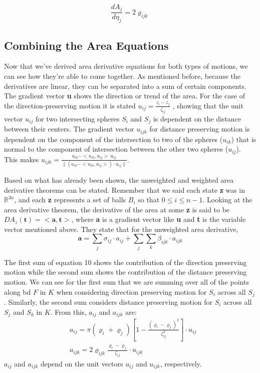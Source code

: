\documentclass{article}
\newcommand{\R}{\mathbb{R}}
\begin{document}
\begin{equation*}
\frac{dA_j}{d\eta_j }= 2\varrho_{ijk}
\end{equation*}

\subsection{Combining the Area Equations}
Now that we've derived area derivative equations for both types of motions, we can see how they’re able to come together. As mentioned before, because the derivatives are linear, they can be separated into a sum of certain components. The gradient vector \textbf{u} shows the direction or trend of the area. For the case of the direction-preserving motion it is stated $u_{ij} = \frac{z_i - z_j}{\zeta_{ij}}$ , showing that the unit vector $u_{ij}$ for two intersecting spheres $S_i$ and $S_j$ is dependent on the distance between their centers. The gradient vector $u_{ijk}$ for distance preserving motion is dependent on the component of the intersection to two of the spheres ($u_{ik}$) that is normal to the component of intersection between the other two spheres ($u_{ij}$). This makes $u_{ijk} = \frac{u_{ik} - <u_{ik},u_{ij}> \cdot u_{ij}}{\|(u_{ik} - <u_{ik},u_{ij}>) \cdot u_{ij}\|}$.

Based on what has already been shown, the unweighted and weighted area derivative theorems can be stated. Remember that we said each state \textbf{z} was in $\R^{3n}$, and each \textbf{z} represents a set of balls $B_i$ so that $0\leq i \leq n-1$. Looking at the area derivative theorem, the derivative of the area at some \textbf{z} is said to be $DA_z(\textbf{t}) = <\textbf{a},\textbf{t}>$, where \textbf{a} is a gradient vector like \textbf{u} and 	\textbf{t} is the variable vector mentioned above. They state that for the unweighted area derivative,
\begin{equation}
\textbf{a} = \sum_j \sigma_{ij}\cdot a_{ij}+ \sum_j \sum_k \beta_{ijk}\cdot a_{ijk}
\end{equation}

The first sum of equation 10 shows the contribution of the direction preserving motion while the second sum shows the contribution of the distance preserving motion. We can see for the first sum that we are summing over all of the points along bd $F$ in $K$ when considering direction preserving motion for $S_i$ across all $S_j$. Similarly, the second sum considers distance preserving motion for $S_i$ across all $S_j$ and $S_k$ in $K$. From this, $a_{ij}$ and $a_{ijk}$ are:
\begin{align*}
&a_{ij} = \pi(\varrho_i+\varrho_j)\left[1 - \frac{(\varrho_i - \varrho_j)^2}{\zeta_{ij}^2}\right]\cdot u_{ij}\\
&a_{ijk} = 2\varrho_{ijk}\frac{\varrho_i - \varrho_j}{\zeta_{ij}} \cdot u_{ijk}
\end{align*}
$a_{ij}$ and $a_{ijk}$ depend on the unit vectors $u_{ij}$ and $u_{ijk}$, respectively.
\end{document}

